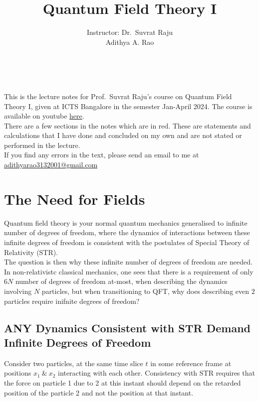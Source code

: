 \documentclass[11pt, notitlepage]{report}
\title{Quantum Field Theory I}
\author{Instructor: Dr.\ Suvrat Raju\vspace{30pt}\\ Adithya A. Rao}
\date{~}
\numberwithin{equation}{section}
\begin{document}
    \maketitle

    This is the lecture notes for Prof.\ Suvrat Raju's course on Quantum Field Theory I, given at ICTS Bangalore in the semester Jan-April 2024.
    The course is available on youtube \href{https://youtu.be/9kqScPIkkRU?si=UH9KUZaF0YiDwxdu}{here}. \\
    There are a few sections in the notes which are in red. These are statements and calculations that I have done and concluded on my own and are not stated or performed in the lecture.\\
    If you find any errors in the text, please send an email to me at \href{mailto:adithyarao3132001@gmail.com}{adithyarao3132001@gmail.com}

    \thispagestyle{empty}
    \tableofcontents
    \newpage
    \setcounter{page}{1}


    
    \section{The Need for Fields}
    Quantum field theory is your normal quantum mechanics generalised to infinite number of degrees of freedom, where the dynamics of interactions between these infinite degrees of freedom is consistent with the postulates of Special Theory of Relativity (STR).\\

    The question is then why these infinite number of degrees of freedom are needed. In non-relativistc classical mechanics, one sees that there is a requirement of only \(6N\) number of degrees of freedom at-most, when describing the dynamics involving \(N\) particles, but when transitioning to QFT, why does describing even \(2\) particles require inifnite degrees of freedom? 

    \subsection{ANY Dynamics Consistent with STR Demand Infinite Degrees of Freedom}
    Consider two particles, at the same time slice \(t\) in some reference frame at positions \(x_1~\&~x_2\) interacting with each other. Consistency with STR requires that the force on particle 1 due to 2 at this instant should depend on the retarded position of the particle 2 and not the position at that instant. 
\end{document}
